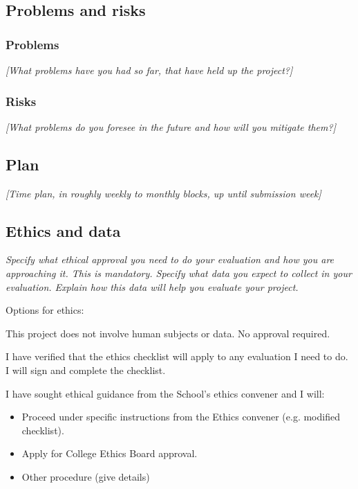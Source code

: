 \documentclass[11pt]{article}
\begin{document}
\subsection{Problems and risks}\label{problems-and-risks}

\subsubsection{Problems}\label{problems}

\emph{{[}What problems have you had so far, that have held up the
project?{]}}

\subsubsection{Risks}\label{risks}

\emph{{[}What problems do you foresee in the future and how will you
mitigate them?{]}}

\subsection{Plan}\label{plan}

\emph{{[}Time plan, in roughly weekly to monthly blocks, up until
submission week{]}}

    
\subsection{Ethics and data}\label{ethics}
\emph{Specify what ethical approval you need to do your evaluation and how you are approaching it. This is mandatory. 
Specify what data you expect to collect in your evaluation. Explain how this data will help you evaluate your project.
}

Options for ethics:
\item This project does not involve human subjects or data. No approval required.
\item I have verified that the ethics checklist will apply to any evaluation I need to do. I will sign and complete the checklist.
\item I have sought ethical guidance from the School's ethics convener and I will:
\begin{itemize}
    \item Proceed under specific instructions from the Ethics convener (e.g. modified checklist).
    \item Apply for College Ethics Board approval.
    \item Other procedure (give details)
\end{itemize}    
\end{document}
